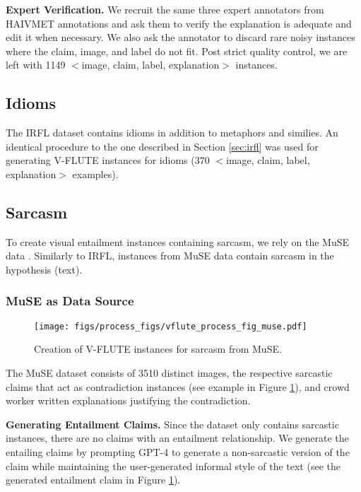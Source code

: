 {\bf Expert Verification.} We recruit the same three expert annotators from HAIVMET annotations and ask them to verify the explanation is adequate and edit it when necessary. We also ask the annotator to discard rare noisy instances where the claim, image, and label do not fit. Post strict quality control, we are left with 1149 $<$image, claim, label, explanation$>$ instances. 

\subsection{Idioms}
The IRFL dataset contains idioms in addition to metaphors and similies. An identical procedure to the one described in Section \ref{sec:irfl} was used for generating V-FLUTE instances for idioms (370 $<$image, claim, label, explanation$>$ examples). 

\subsection{Sarcasm}

To create visual entailment instances containing sarcasm, we rely on the MuSE data \cite{desai2022nice}. Similarly to IRFL, instances from MuSE data contain sarcasm in the hypothesis (text). 

\subsubsection{MuSE as Data Source} 

\begin{figure}[htbp]
    \centering
    \texttt{[image: figs/process\_figs/vflute\_process\_fig\_muse.pdf]}
    \caption{Creation of V-FLUTE instances for sarcasm from MuSE.}
    \label{fig:museFig}
\end{figure}

The MuSE dataset \cite{desai2022nice} consists of 3510 distinct images, the respective sarcastic claims that act as contradiction instances (see example in Figure \ref{fig:museFig}), and crowd worker written explanations justifying the contradiction. 

{\bf Generating Entailment Claims.}
Since the dataset only contains sarcastic instances, there are no claims with an entailment relationship. We generate the entailing claims by prompting GPT-4 to generate a non-sarcastic version of the claim while maintaining the user-generated informal style of the text (see the generated entailment claim in Figure \ref{fig:museFig}). 

